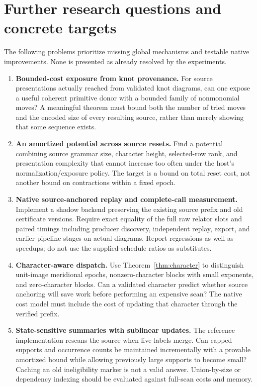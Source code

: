 \documentclass[11pt,letterpaper]{article}
\theoremstyle{definition}
\theoremstyle{remark}\newtheorem{remark}[theorem]{Remark}
\begin{document}
\section{Further research questions and concrete targets}
\label{sec:questions}

The following problems prioritize missing global mechanisms and testable native
improvements. None is presented as already resolved by the experiments.

\begin{enumerate}[label=\textbf{Q\arabic*.},leftmargin=2.6em]
\item \textbf{Bounded-cost exposure from knot provenance.}
For source presentations actually reached from validated knot diagrams, can
one expose a useful coherent primitive donor with a bounded family of
nonmonomial moves? A meaningful theorem must bound both the number of tried
moves and the encoded size of every resulting source, rather than merely
showing that some sequence exists.

\item \textbf{An amortized potential across source resets.}
Find a potential combining source grammar size, character height, selected-row
rank, and presentation complexity that cannot increase too often under the
host's normalization/exposure policy. The target is a bound on total reset
cost, not another bound on contractions within a fixed epoch.

\item \textbf{Native source-anchored replay and complete-call measurement.}
Implement a shadow backend preserving the existing source prefix and old
certificate versions. Require exact equality of the full raw relator slots
and paired timings including producer discovery, independent replay, export,
and earlier pipeline stages on actual diagrams. Report regressions as well as
speedups; do not use the supplied-schedule ratios as substitutes.

\item \textbf{Character-aware dispatch.}
Use Theorem~\ref{thm:character} to distinguish unit-image meridional epochs,
nonzero-character blocks with small exponents, and zero-character blocks.
Can a validated character predict whether source anchoring will save work
before performing an expensive scan? The native cost model must include the
cost of updating that character through the verified prefix.

\item \textbf{State-sensitive summaries with sublinear updates.}
The reference implementation rescans the source when live labels merge.
Can capped supports and occurrence counts be maintained incrementally with a
provable amortized bound while allowing previously large supports to become
small? Caching an old ineligibility marker is not a valid answer. Union-by-size
or dependency indexing should be evaluated against full-scan costs and memory.


\end{enumerate}
\end{document}

